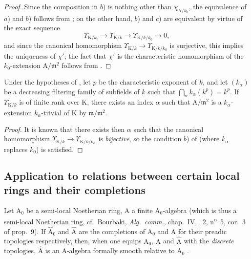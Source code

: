 \begin{proof}
Since the composition in $b$) is nothing other than $\chi_{\mathrm{A}/k_0}$, the equivalence of $a$) and $b$) follows from ; on the other hand, $b$) and $c$) are equivalent by virtue of the exact sequence 
\[
  \Upsilon_{\mathrm{K}/k_0}\to\Upsilon_{\mathrm{K}/k}\to\Upsilon_{\mathrm{K}/k/k_0}\to0,
\]
and since the canonical homomorphism $\Upsilon_{\mathrm{K}/k}\to\Upsilon_{\mathrm{K}/k/k_0}$ is surjective, this implies the uniqueness of $\chi'$; the fact that $\chi'$ is the characteristic homomorphism of the $k_0$-extension $\mathrm{A}/\mathfrak{m}^2$ follows from .
\end{proof}

\begin{corollary}[22.2.11]
\label{0.22.2.11}
Under the hypotheses of , let $p$ be the characteristic exponent of $k$, and let $(k_\alpha)$ be a decreasing filtering family of subfields of $k$ such that $\bigcap_\alpha k_\alpha(k^p)=k^p$.
If $\Upsilon_{\mathrm{K}/k}$ is of finite rank over $\mathrm{K}$, there exists an index $\alpha$ such that $\mathrm{A}/\mathfrak{m}^2$ is a $k_\alpha$-extension $k_\alpha$-trivial of $\mathrm{K}$ by $\mathfrak{m}/\mathfrak{m}^2$.
\end{corollary}

\begin{proof}
It is known  that there exists then $\alpha$ such that the canonical homomorphism $\Upsilon_{\mathrm{K}/k}\to\Upsilon_{\mathrm{K}/k/k_\alpha}$ is \emph{bijective}, so the condition $b$) of  (where $k_\alpha$ replaces $k_0$) is satisfied.
\end{proof}

\subsection{Application to relations between certain local rings and their completions}
\label{subsection:0.22.3}

\begin{lemma}[22.3.1]
\label{0.22.3.1}
Let $\mathrm{A}_0$ be a semi-local Noetherian ring, $\mathrm{A}$ a finite $\mathrm{A}_0$-algebra (which is thus a semi-local Noetherian ring, \textup{cf.~Bourbaki, \emph{Alg.~comm.}, chap.~IV, \textsection~2, n\textsuperscript{o}~5, cor.~3 of prop.~9)}.
If $\widehat{\mathrm{A}}_0$ and $\widehat{\mathrm{A}}$ are the completions of $\mathrm{A}_0$ and $\mathrm{A}$ for their preadic topologies respectively, then, when one equips $\mathrm{A}_0$, $\mathrm{A}$ and $\widehat{\mathrm{A}}$ with the \emph{discrete} topologies, $\widehat{\mathrm{A}}$ is an $\mathrm{A}$-algebra formally smooth relative to $\mathrm{A}_0$ .
\end{lemma}

